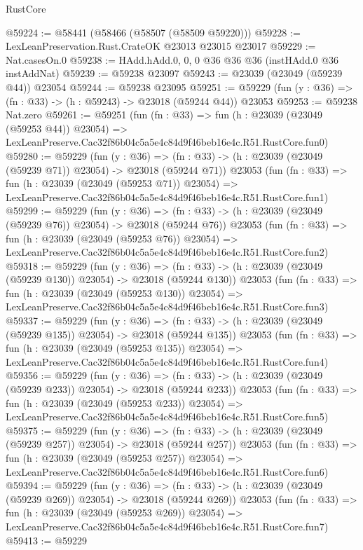 \begin{lexlean}{RustCore}
\begin{coremodule}
@59224 := @58441 (@58466 (@58507 (@58509 @59220)))
@59228 := LexLeanPreservation.Rust.CrateOK @23013 @23015 @23017
@59229 := Nat.casesOn.{0}
@59238 := HAdd.hAdd.{0, 0, 0} @36 @36 @36 (instHAdd.{0} @36 instAddNat)
@59239 := @59238 @23097
@59243 := @23039 (@23049 (@59239 @44)) @23054
@59244 := @59238 @23095
@59251 := @59229 (fun (y : @36) => (fn : @33) -> (h : @59243) -> @23018 (@59244 @44)) @23053
@59253 := @59238 Nat.zero
@59261 := @59251
    (fun (fn : @33) =>
    fun (h : @23039 (@23049 (@59253 @44)) @23054) =>
    LexLeanPreserve.Cac32f86b04c5a5e4c84d9f46beb16e4c.R51.RustCore.fun0)
@59280 := @59229
    (fun (y : @36) =>
    (fn : @33) -> (h : @23039 (@23049 (@59239 @71)) @23054) -> @23018 (@59244 @71))
    @23053
    (fun (fn : @33) =>
    fun (h : @23039 (@23049 (@59253 @71)) @23054) =>
    LexLeanPreserve.Cac32f86b04c5a5e4c84d9f46beb16e4c.R51.RustCore.fun1)
@59299 := @59229
    (fun (y : @36) =>
    (fn : @33) -> (h : @23039 (@23049 (@59239 @76)) @23054) -> @23018 (@59244 @76))
    @23053
    (fun (fn : @33) =>
    fun (h : @23039 (@23049 (@59253 @76)) @23054) =>
    LexLeanPreserve.Cac32f86b04c5a5e4c84d9f46beb16e4c.R51.RustCore.fun2)
@59318 := @59229
    (fun (y : @36) =>
    (fn : @33) -> (h : @23039 (@23049 (@59239 @130)) @23054) -> @23018 (@59244 @130))
    @23053
    (fun (fn : @33) =>
    fun (h : @23039 (@23049 (@59253 @130)) @23054) =>
    LexLeanPreserve.Cac32f86b04c5a5e4c84d9f46beb16e4c.R51.RustCore.fun3)
@59337 := @59229
    (fun (y : @36) =>
    (fn : @33) -> (h : @23039 (@23049 (@59239 @135)) @23054) -> @23018 (@59244 @135))
    @23053
    (fun (fn : @33) =>
    fun (h : @23039 (@23049 (@59253 @135)) @23054) =>
    LexLeanPreserve.Cac32f86b04c5a5e4c84d9f46beb16e4c.R51.RustCore.fun4)
@59356 := @59229
    (fun (y : @36) =>
    (fn : @33) -> (h : @23039 (@23049 (@59239 @233)) @23054) -> @23018 (@59244 @233))
    @23053
    (fun (fn : @33) =>
    fun (h : @23039 (@23049 (@59253 @233)) @23054) =>
    LexLeanPreserve.Cac32f86b04c5a5e4c84d9f46beb16e4c.R51.RustCore.fun5)
@59375 := @59229
    (fun (y : @36) =>
    (fn : @33) -> (h : @23039 (@23049 (@59239 @257)) @23054) -> @23018 (@59244 @257))
    @23053
    (fun (fn : @33) =>
    fun (h : @23039 (@23049 (@59253 @257)) @23054) =>
    LexLeanPreserve.Cac32f86b04c5a5e4c84d9f46beb16e4c.R51.RustCore.fun6)
@59394 := @59229
    (fun (y : @36) =>
    (fn : @33) -> (h : @23039 (@23049 (@59239 @269)) @23054) -> @23018 (@59244 @269))
    @23053
    (fun (fn : @33) =>
    fun (h : @23039 (@23049 (@59253 @269)) @23054) =>
    LexLeanPreserve.Cac32f86b04c5a5e4c84d9f46beb16e4c.R51.RustCore.fun7)
@59413 := @59229

\end{coremodule}
\end{lexlean}
